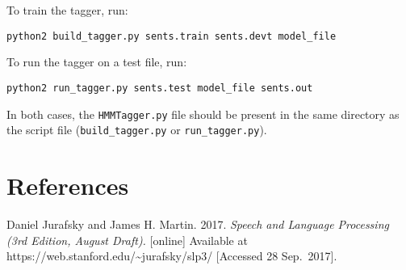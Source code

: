 \documentclass[12pt,article,oneside,onecolumn,final,a4paper]{memoir}
\theoremstyle{myplain}
\theoremstyle{nonumbermyplain}
\theoremstyle{myplain}
\theoremstyle{nonumbermyplain}
\theoremstyle{nonumberproof}
\theoremstyle{nonumbersolution}
\numberwithin{equation}{chapter}
\begin{document}
To train the tagger, run:
\begin{verbatim}
python2 build_tagger.py sents.train sents.devt model_file
\end{verbatim}

To run the tagger on a test file, run:
\begin{verbatim}
python2 run_tagger.py sents.test model_file sents.out
\end{verbatim}

In both cases, the \texttt{HMMTagger.py} file should be present in the
same directory as the script file (\texttt{build\_tagger.py} or
\texttt{run\_tagger.py}).

\section{References}

\begin{description}
\item Daniel Jurafsky and James H. Martin.
  2017. \textit{Speech and Language Processing (3rd Edition,
    August Draft).} [online] Available at
  https://web.stanford.edu/\textasciitilde jurafsky/slp3/ [Accessed 28 Sep.\
  2017].
\end{description}
\end{document}
